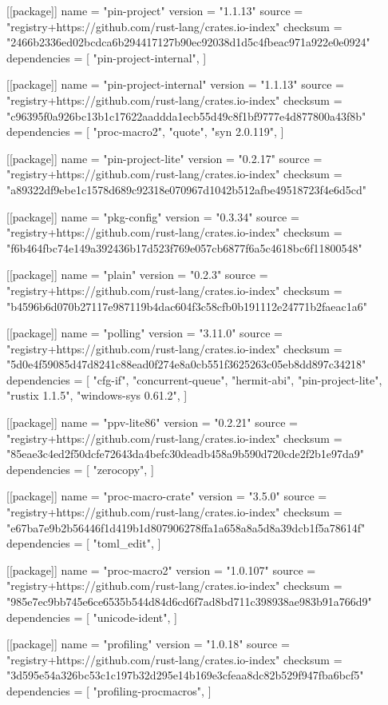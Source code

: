 [[package]]
name = "pin-project"
version = "1.1.13"
source = "registry+https://github.com/rust-lang/crates.io-index"
checksum = "2466b2336ed02bcdca6b294417127b90ec92038d1d5c4fbeac971a922e0e0924"
dependencies = [
 "pin-project-internal",
]

[[package]]
name = "pin-project-internal"
version = "1.1.13"
source = "registry+https://github.com/rust-lang/crates.io-index"
checksum = "c96395f0a926bc13b1c17622aaddda1ecb55d49c8f1bf9777e4d877800a43f8b"
dependencies = [
 "proc-macro2",
 "quote",
 "syn 2.0.119",
]

[[package]]
name = "pin-project-lite"
version = "0.2.17"
source = "registry+https://github.com/rust-lang/crates.io-index"
checksum = "a89322df9ebe1c1578d689c92318e070967d1042b512afbe49518723f4e6d5cd"

[[package]]
name = "pkg-config"
version = "0.3.34"
source = "registry+https://github.com/rust-lang/crates.io-index"
checksum = "f6b464fbc74e149a392436b17d523f769e057cb6877f6a5c4618bc6f11800548"

[[package]]
name = "plain"
version = "0.2.3"
source = "registry+https://github.com/rust-lang/crates.io-index"
checksum = "b4596b6d070b27117e987119b4dac604f3c58cfb0b191112e24771b2faeac1a6"

[[package]]
name = "polling"
version = "3.11.0"
source = "registry+https://github.com/rust-lang/crates.io-index"
checksum = "5d0e4f59085d47d8241c88ead0f274e8a0cb551f3625263c05eb8dd897c34218"
dependencies = [
 "cfg-if",
 "concurrent-queue",
 "hermit-abi",
 "pin-project-lite",
 "rustix 1.1.5",
 "windows-sys 0.61.2",
]

[[package]]
name = "ppv-lite86"
version = "0.2.21"
source = "registry+https://github.com/rust-lang/crates.io-index"
checksum = "85eae3c4ed2f50dcfe72643da4befc30deadb458a9b590d720cde2f2b1e97da9"
dependencies = [
 "zerocopy",
]

[[package]]
name = "proc-macro-crate"
version = "3.5.0"
source = "registry+https://github.com/rust-lang/crates.io-index"
checksum = "e67ba7e9b2b56446f1d419b1d807906278ffa1a658a8a5d8a39dcb1f5a78614f"
dependencies = [
 "toml_edit",
]

[[package]]
name = "proc-macro2"
version = "1.0.107"
source = "registry+https://github.com/rust-lang/crates.io-index"
checksum = "985e7ec9bb745e6ce6535b544d84d6cd6f7ad8bd711c398938ae983b91a766d9"
dependencies = [
 "unicode-ident",
]

[[package]]
name = "profiling"
version = "1.0.18"
source = "registry+https://github.com/rust-lang/crates.io-index"
checksum = "3d595e54a326bc53c1c197b32d295e14b169e3cfeaa8dc82b529f947fba6bcf5"
dependencies = [
 "profiling-procmacros",
]

